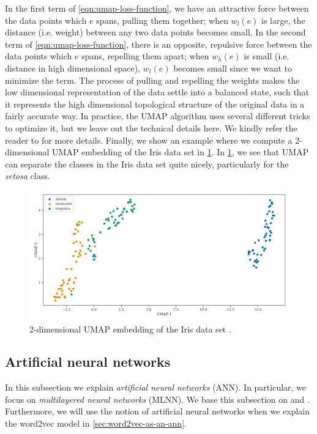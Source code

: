 In the first term of \cref{eqn:umap-loss-function}, we have an attractive force between the data points which $e$ spans, pulling them together; when $w_l(e)$ is large, the distance (i.e. weight) between any two data points becomes small. In the second term of \cref{eqn:umap-loss-function}, there is an opposite, repulsive force between the data points which $e$ spans, repelling them apart; when $w_h(e)$ is small (i.e. distance in high dimensional space), $w_l(e)$ becomes small since we want to minimize the term. The process of pulling and repelling the weights makes the low dimensional representation of the data settle into a balanced state, such that it represents the high dimensional topological structure of the original data in a fairly accurate way. In practice, the UMAP algorithm uses several different tricks to optimize it, but we leave out the technical details here. We kindly refer the reader to \cite{2018arXivUMAP} for more details. Finally, we show an example where we compute a 2-dimensional UMAP embedding of the Iris data set \cite{Fisher1936} in \cref{fig:umap-2d-example}. In \cref{fig:umap-2d-example}, we see that UMAP can separate the classes in the Iris data set quite nicely, particularly for the \textit{setosa} class.
\begin{figure}[H]
    \centering
    \includegraphics[width=\textwidth]{thesis/figures/umap-2d-example.pdf}
    \caption{2-dimensional UMAP embedding of the Iris data set \cite{Fisher1936}.}
    \label{fig:umap-2d-example}
\end{figure}

\subsection{Artificial neural networks}
\label{sec:artificial-neural-networks}
In this subsection we explain \textit{artificial neural networks} (ANN). In particular, we focus on \textit{multilayered neural networks} (MLNN). We base this subsection on \cite[Chapter 1]{Aggarwal18} and \cite{rong2016word2vec}. Furthermore, we will use the notion of artificial neural networks when we explain the word2vec model in \cref{sec:word2vec-as-an-ann}.

